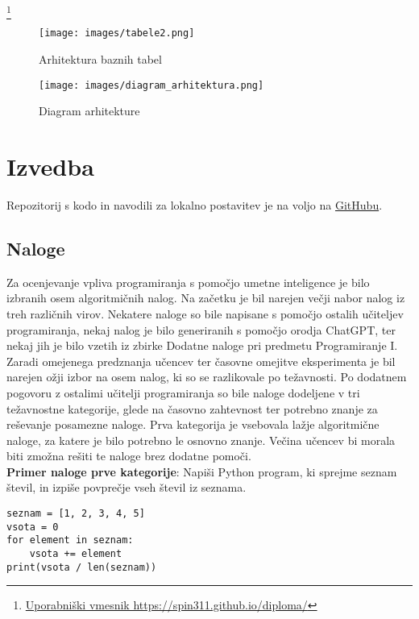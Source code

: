 \documentclass[a4paper,12pt,openright]{book}
\begin{document}
\footnote{\href{https://spin311.github.io/diploma/}{Uporabniški vmesnik https://spin311.github.io/diploma/}}

\begin{figure}[H]
    \centering
    \texttt{[image: images/tabele2.png]}
    \caption{Arhitektura baznih tabel}
    \label{fig:enter-label}
\end{figure}

\begin{figure}[H]
    \centering
    \texttt{[image: images/diagram\_arhitektura.png]}
    \caption{Diagram arhitekture}
    \label{fig:enter-label}
\end{figure}
\section{Izvedba}

Repozitorij s kodo in navodili za lokalno postavitev je na voljo na \href{https://github.com/spin311/hiter-inzeniring-diploma}{GitHubu}. 

\subsection{Naloge}
Za ocenjevanje vpliva programiranja s pomočjo umetne inteligence je bilo izbranih osem algoritmičnih nalog.
Na začetku je bil narejen večji nabor nalog iz treh različnih virov. Nekatere naloge so bile napisane s pomočjo ostalih učiteljev programiranja, nekaj nalog je bilo generiranih s pomočjo orodja ChatGPT, ter nekaj jih je bilo vzetih iz zbirke Dodatne naloge pri predmetu Programiranje I. \cite{dodatneNaloge}
Zaradi omejenega predznanja učencev ter časovne omejitve eksperimenta je bil narejen ožji izbor na osem nalog, ki so se razlikovale po težavnosti. Po dodatnem pogovoru z ostalimi učitelji programiranja so bile naloge dodeljene v tri težavnostne kategorije, glede na časovno zahtevnost ter potrebno znanje za reševanje posamezne naloge. Prva kategorija je vsebovala lažje algoritmične naloge, za katere je bilo potrebno le osnovno znanje. Večina učencev bi morala biti zmožna rešiti te naloge brez dodatne pomoči.
\\
\textbf{Primer naloge prve kategorije}:
Napiši Python program, ki sprejme seznam števil, in izpiše povprečje vseh števil iz seznama.
\begin{lstlisting}[style=python]
seznam = [1, 2, 3, 4, 5]
vsota = 0
for element in seznam:
    vsota += element
print(vsota / len(seznam))
\end{lstlisting}
    
\end{document}
